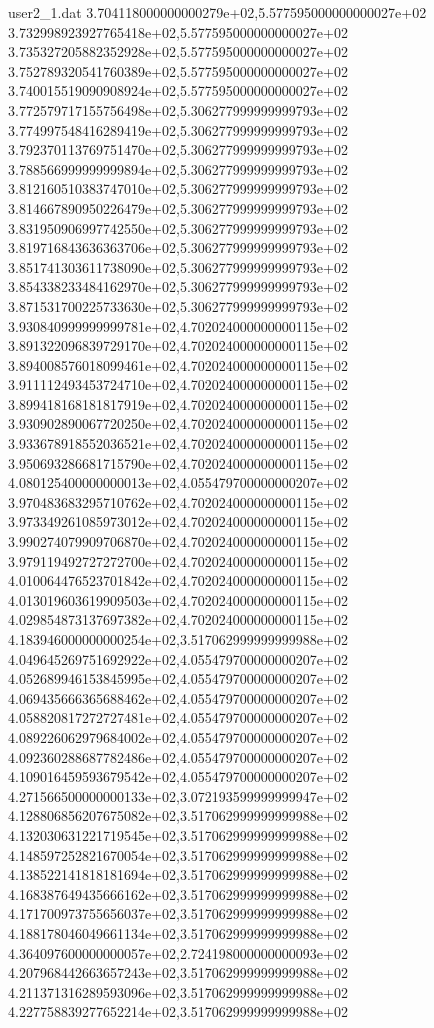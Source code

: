 \begin{filecontents}{user2_1.dat}
3.704118000000000279e+02,5.577595000000000027e+02
3.732998923927765418e+02,5.577595000000000027e+02
3.735327205882352928e+02,5.577595000000000027e+02
3.752789320541760389e+02,5.577595000000000027e+02
3.740015519090908924e+02,5.577595000000000027e+02
3.772579717155756498e+02,5.306277999999999793e+02
3.774997548416289419e+02,5.306277999999999793e+02
3.792370113769751470e+02,5.306277999999999793e+02
3.788566999999999894e+02,5.306277999999999793e+02
3.812160510383747010e+02,5.306277999999999793e+02
3.814667890950226479e+02,5.306277999999999793e+02
3.831950906997742550e+02,5.306277999999999793e+02
3.819716843636363706e+02,5.306277999999999793e+02
3.851741303611738090e+02,5.306277999999999793e+02
3.854338233484162970e+02,5.306277999999999793e+02
3.871531700225733630e+02,5.306277999999999793e+02
3.930840999999999781e+02,4.702024000000000115e+02
3.891322096839729170e+02,4.702024000000000115e+02
3.894008576018099461e+02,4.702024000000000115e+02
3.911112493453724710e+02,4.702024000000000115e+02
3.899418168181817919e+02,4.702024000000000115e+02
3.930902890067720250e+02,4.702024000000000115e+02
3.933678918552036521e+02,4.702024000000000115e+02
3.950693286681715790e+02,4.702024000000000115e+02
4.080125400000000013e+02,4.055479700000000207e+02
3.970483683295710762e+02,4.702024000000000115e+02
3.973349261085973012e+02,4.702024000000000115e+02
3.990274079909706870e+02,4.702024000000000115e+02
3.979119492727272700e+02,4.702024000000000115e+02
4.010064476523701842e+02,4.702024000000000115e+02
4.013019603619909503e+02,4.702024000000000115e+02
4.029854873137697382e+02,4.702024000000000115e+02
4.183946000000000254e+02,3.517062999999999988e+02
4.049645269751692922e+02,4.055479700000000207e+02
4.052689946153845995e+02,4.055479700000000207e+02
4.069435666365688462e+02,4.055479700000000207e+02
4.058820817272727481e+02,4.055479700000000207e+02
4.089226062979684002e+02,4.055479700000000207e+02
4.092360288687782486e+02,4.055479700000000207e+02
4.109016459593679542e+02,4.055479700000000207e+02
4.271566500000000133e+02,3.072193599999999947e+02
4.128806856207675082e+02,3.517062999999999988e+02
4.132030631221719545e+02,3.517062999999999988e+02
4.148597252821670054e+02,3.517062999999999988e+02
4.138522141818181694e+02,3.517062999999999988e+02
4.168387649435666162e+02,3.517062999999999988e+02
4.171700973755656037e+02,3.517062999999999988e+02
4.188178046049661134e+02,3.517062999999999988e+02
4.364097600000000057e+02,2.724198000000000093e+02
4.207968442663657243e+02,3.517062999999999988e+02
4.211371316289593096e+02,3.517062999999999988e+02
4.227758839277652214e+02,3.517062999999999988e+02

\end{filecontents}

